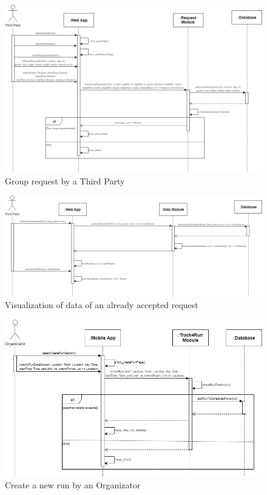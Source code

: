 \begin{figure}[H]
    \centering
    \includegraphics[scale=0.35]{DD/Pictures/groupRequestSeqDiagDD.png}
    \caption{Group request by a Third Party}
\end{figure}

\begin{figure}[H]
    \centering
    \includegraphics[scale=0.35]{DD/Pictures/showDataResult.png}
    \caption{Visualization of data of an already accepted request}
\end{figure}


\begin{figure}[H]
    \centering
    \includegraphics[scale=0.35]{DD/Pictures/createRunSeqDiagDD.png}
    \caption{Create a new run by an Organizator}
\end{figure}

